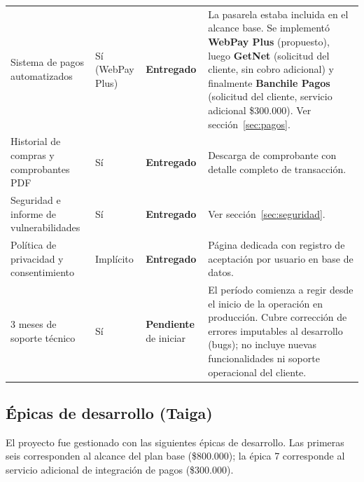 \documentclass[a4paper,11pt]{article}
\newcommand{\entregado}{\textcolor{checkgreen}{\textbf{Entregado}}}
\newcommand{\pendiente}{\textcolor{warnorange}{\textbf{Pendiente}}}
\begin{document}
\begin{longtable}{L{4cm} C{3.5cm} C{2.3cm} L{4.5cm}}
Sistema de pagos automatizados & S\'i (WebPay Plus) & \entregado &
  La pasarela estaba incluida en el alcance base. Se implement\'o
  \textbf{WebPay Plus} (propuesto), luego \textbf{GetNet} (solicitud del cliente,
  sin cobro adicional) y finalmente \textbf{Banchile Pagos} (solicitud del cliente,
  servicio adicional \$300.000). Ver secci\'on~\ref{sec:pagos}. \\

Historial de compras y comprobantes PDF & S\'i & \entregado &
  Descarga de comprobante con detalle completo de transacci\'on. \\

Seguridad e informe de vulnerabilidades & S\'i & \entregado &
  Ver secci\'on~\ref{sec:seguridad}. \\

Pol\'itica de privacidad y consentimiento & Impl\'icito & \entregado &
  P\'agina dedicada con registro de aceptaci\'on por usuario en base de datos. \\

3 meses de soporte t\'ecnico & S\'i & \pendiente{} de iniciar &
  El per\'iodo comienza a regir desde el inicio de la operaci\'on en producci\'on.
  Cubre correcci\'on de errores imputables al desarrollo (bugs); no incluye
  nuevas funcionalidades ni soporte operacional del cliente. \\

\end{longtable}


\subsection*{\'Epicas de desarrollo (Taiga)}

El proyecto fue gestionado con las siguientes \'epicas de desarrollo. Las primeras seis
corresponden al alcance del plan base (\$800.000); la \'epica 7 corresponde al
servicio adicional de integraci\'on de pagos (\$300.000).
\end{document}
